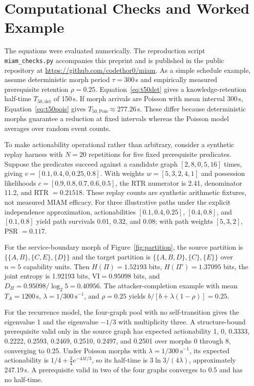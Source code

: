\documentclass[11pt,letterpaper]{article}
\begin{document}
\section{Computational Checks and Worked Example}\label{sec:checks}

The equations were evaluated numerically. The reproduction script \texttt{miam\_checks.py} accompanies this preprint and is published in the public repository at \url{https://github.com/codethor0/miam}. As a simple schedule example, assume deterministic morph period $\tau=300$\,s and empirically measured prerequisite retention $\rho=0.25$. Equation~\eqref{eq:t50det} gives a knowledge-retention half-time $T_{50,\mathrm{det}}$ of 150\,s. If morph arrivals are Poisson with mean interval 300\,s, Equation~\eqref{eq:t50pois} gives $T_{50,\mathrm{Pois}}\approx277.26$\,s. These differ because deterministic morphs guarantee a reduction at fixed intervals whereas the Poisson model averages over random event counts.

To make actionability operational rather than arbitrary, consider a synthetic replay harness with $N=20$ repetitions for five fixed prerequisite predicates. Suppose the predicates succeed against a candidate graph $[2,8,0,5,16]$ times, giving $v=[0.1,0.4,0,0.25,0.8]$. With weights $w=[5,3,2,4,1]$ and possession likelihoods $c=[0.9,0.8,0.7,0.6,0.5]$, the RTR numerator is 2.41, denominator 11.2, and RTR $=0.21518$. These replay counts are synthetic arithmetic fixtures, not measured MIAM efficacy. For three illustrative paths under the explicit independence approximation, actionabilities $[0.1,0.4,0.25]$, $[0.4,0.8]$, and $[0.1,0.8]$ yield path survivals 0.01, 0.32, and 0.08; with path weights $[5,3,2]$, PSR $=0.117$.

For the service-boundary morph of Figure~\ref{fig:partition}, the source partition is $\{\{A,B\},\{C,E\},\{D\}\}$ and the target partition is $\{\{A,B,D\},\{C\},\{E\}\}$ over $n=5$ capability units. Then $H(\Pi)=1.52193$ bits, $H(\Pi')=1.37095$ bits, the joint entropy is 1.92193 bits, $\mathrm{VI}=0.95098$ bits, and $D_\Pi=0.95098/\log_2 5=0.40956$. The attacker-completion example with mean $T_A=1200$\,s, $\lambda=1/300\ \mathrm{s}^{-1}$, and $\rho=0.25$ yields $b/[b+\lambda(1-\rho)]=0.25$.

For the recurrence model, the four-graph pool with no self-transition gives the eigenvalue 1 and the eigenvalue $-1/3$ with multiplicity three. A structure-bound prerequisite valid only in the source graph has expected actionability 1, 0, 0.3333, 0.2222, 0.2593, 0.2469, 0.2510, 0.2497, and 0.2501 over morphs 0 through 8, converging to 0.25. Under Poisson morphs with $\lambda=1/300\ \mathrm{s}^{-1}$, its expected actionability is $1/4+\tfrac34e^{-4\lambda t/3}$, so its half-time is $3\ln 3/(4\lambda)$, approximately 247.19\,s. A prerequisite valid in two of the four graphs converges to 0.5 and has no half-time.
\end{document}
